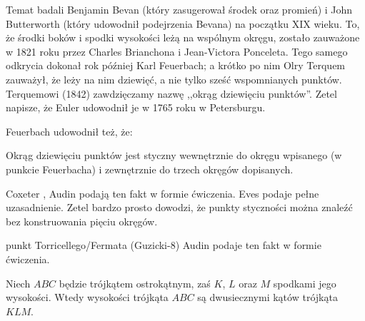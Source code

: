 Temat badali Benjamin Bevan (który zasugerował środek oraz promień) i John Butterworth (który udowodnił podejrzenia Bevana) na początku XIX wieku.
%
%
To, że środki boków i spodki wysokości leżą na wspólnym okręgu, zostało zauważone w 1821 roku przez Charles Brianchona i Jean-Victora Ponceleta.
%
%
Tego samego odkrycia dokonał rok później Karl Feuerbach; a krótko po nim Olry Terquem zauważył, że leży na nim dziewięć, a nie tylko sześć wspomnianych punktów.
%
%
Terquemowi (1842) zawdzięczamy nazwę ,,okrąg dziewięciu punktów''.
Zetel napisze, że Euler udowodnił je w 1765 roku w Petersburgu.

Feuerbach udowodnił też, że:

\begin{theorem}[Feuerbacha]
\label{punkt_feuerbacha}%
	Okrąg dziewięciu punktów jest styczny wewnętrznie do okręgu wpisanego (w punkcie Feuerbacha) i zewnętrznie do trzech okręgów dopisanych.
\end{theorem}

Coxeter \cite[s. 99]{coxeter_1967}, Audin \cite[s. 110]{audin_2003} podają ten fakt w formie ćwiczenia.
Eves \cite[s. 133]{eves1_1972} podaje pełne uzasadnienie.
Zetel \cite[s. 70]{zetel_2020} bardzo prosto dowodzi, że punkty styczności można znaleźć bez konstruowania pięciu okręgów.

punkt Torricellego/Fermata (Guzicki-8)
Audin \cite[s. 105]{audin_2003} podaje ten fakt w formie ćwiczenia.

\begin{proposition}
	\label{orthic_triangle}
	Niech $ABC$ będzie trójkątem ostrokątnym, zaś $K$, $L$ oraz $M$ spodkami jego wysokości.
	Wtedy wysokości trójkąta $ABC$ są dwusiecznymi kątów trójkąta $KLM$.
\end{proposition}

